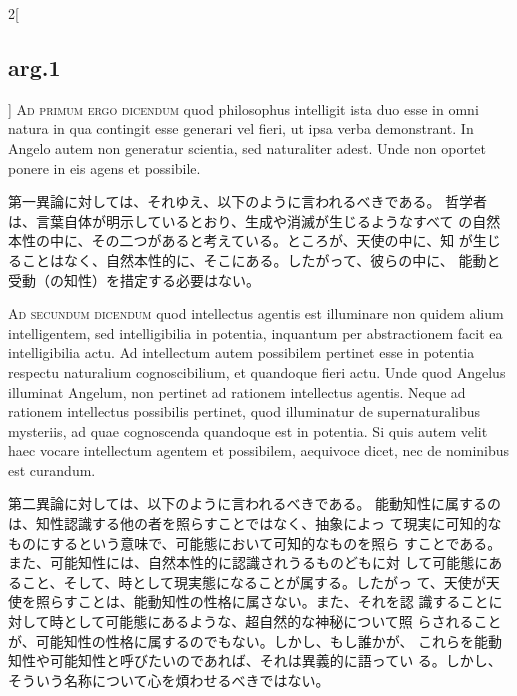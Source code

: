 \documentclass[paper=a4paper,fontsize=10pt,jafontsize=9pt,titlepage]{jlreq}
\begin{document}
\begin{paracol}{2}[\subsection{arg.1}]
{\scshape Ad primum ergo dicendum} quod philosophus
intelligit ista duo esse in omni natura in qua contingit esse generari
vel fieri, ut ipsa verba demonstrant. In Angelo autem non generatur
scientia, sed naturaliter adest. Unde non oportet ponere in eis agens et
possibile.

\switchcolumn

第一異論に対しては、それゆえ、以下のように言われるべきである。
哲学者は、言葉自体が明示しているとおり、生成や消滅が生じるようなすべて
 の自然本性の中に、その二つがあると考えている。ところが、天使の中に、知
 が生じることはなく、自然本性的に、そこにある。したがって、彼らの中に、
 能動と受動（の知性）を措定する必要はない。

\switchcolumn*[\subsection{ad.2}]

{\scshape Ad secundum dicendum} quod intellectus
agentis est illuminare non quidem alium intelligentem, sed
intelligibilia in potentia, inquantum per abstractionem facit ea
intelligibilia actu. Ad intellectum autem possibilem pertinet esse in
potentia respectu naturalium cognoscibilium, et quandoque fieri
actu. Unde quod Angelus illuminat Angelum, non pertinet ad rationem
intellectus agentis. Neque ad rationem intellectus possibilis pertinet,
quod illuminatur de supernaturalibus mysteriis, ad quae cognoscenda
quandoque est in potentia. Si quis autem velit haec vocare intellectum
agentem et possibilem, aequivoce dicet, nec de nominibus est curandum.

\switchcolumn

第二異論に対しては、以下のように言われるべきである。
能動知性に属するのは、知性認識する他の者を照らすことではなく、抽象によっ
 て現実に可知的なものにするという意味で、可能態において可知的なものを照ら
 すことである。また、可能知性には、自然本性的に認識されうるものどもに対
 して可能態にあること、そして、時として現実態になることが属する。したがっ
 て、天使が天使を照らすことは、能動知性の性格に属さない。また、それを認
 識することに対して時として可能態にあるような、超自然的な神秘について照
 らされることが、可能知性の性格に属するのでもない。しかし、もし誰かが、
 これらを能動知性や可能知性と呼びたいのであれば、それは異義的に語ってい
 る。しかし、そういう名称について心を煩わせるべきではない。

\end{paracol}
\newpage
{}
{}
\setcounter{section}{5}
\setcounter{subsection}{0}
\end{document}
